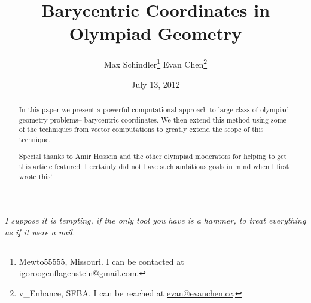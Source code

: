 \documentclass[11pt, notitlepage]{report}
\begin{document}
\title{Barycentric Coordinates in Olympiad Geometry}
\author{
  Max Schindler\thanks{Mewto55555, Missouri.
  I can be contacted at \href{mailto:igoroogenflagenstein@gmail.com}{igoroogenflagenstein@gmail.com}.}
  \qquad
  Evan Chen\thanks{v\_Enhance, SFBA.
  I can be reached at \href{mailto:evan@evanchen.cc}{evan@evanchen.cc}.}
  }
\date{July 13, 2012}

\maketitle


\begin{center}
\begin{minipage}{8.4cm}
  \textit{I suppose it is tempting, if the only tool you have is a hammer, to treat everything as if it were a nail.}
\end{minipage}
\end{center}


\begin{abstract}
In this paper we present a powerful computational approach to large class of olympiad geometry problems-- barycentric coordinates.  We then extend this method using some of the techniques from vector computations to greatly extend the scope of this technique.

Special thanks to Amir Hossein and the other olympiad moderators for helping to get this article featured: I certainly did not have such ambitious goals in mind when I first wrote this!
\end{abstract}
\tableofcontents









\appendix




\end{document}
